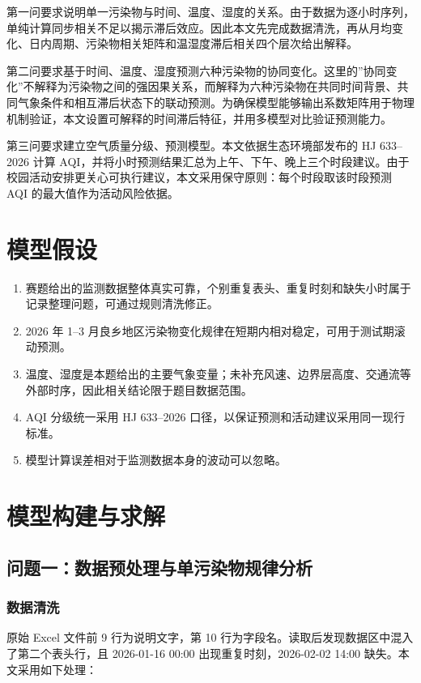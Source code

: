\documentclass[UTF8,a4paper,12pt]{ctexart}
\begin{document}
第一问要求说明单一污染物与时间、温度、湿度的关系。由于数据为逐小时序列，单纯计算同步相关不足以揭示滞后效应。因此本文先完成数据清洗，再从月均变化、日内周期、污染物相关矩阵和温湿度滞后相关四个层次给出解释。

第二问要求基于时间、温度、湿度预测六种污染物的协同变化。这里的”协同变化”不解释为污染物之间的强因果关系，而解释为六种污染物在共同时间背景、共同气象条件和相互滞后状态下的联动预测。为确保模型能够输出系数矩阵用于物理机制验证，本文设置可解释的时间滞后特征，并用多模型对比验证预测能力。

第三问要求建立空气质量分级、预测模型。本文依据生态环境部发布的 HJ 633--2026 计算 AQI，并将小时预测结果汇总为上午、下午、晚上三个时段建议。由于校园活动安排更关心可执行建议，本文采用保守原则：每个时段取该时段预测 AQI 的最大值作为活动风险依据。

\section{模型假设}

\begin{enumerate}
  \item 赛题给出的监测数据整体真实可靠，个别重复表头、重复时刻和缺失小时属于记录整理问题，可通过规则清洗修正。
  \item 2026 年 1--3 月良乡地区污染物变化规律在短期内相对稳定，可用于测试期滚动预测。
  \item 温度、湿度是本题给出的主要气象变量；未补充风速、边界层高度、交通流等外部时序，因此相关结论限于题目数据范围。
  \item AQI 分级统一采用 HJ 633--2026 口径，以保证预测和活动建议采用同一现行标准。
  \item 模型计算误差相对于监测数据本身的波动可以忽略。
\end{enumerate}

\section{模型构建与求解}

\subsection{问题一：数据预处理与单污染物规律分析}

\subsubsection{数据清洗}

原始 Excel 文件前 9 行为说明文字，第 10 行为字段名。读取后发现数据区中混入了第二个表头行，且 2026-01-16 00:00 出现重复时刻，2026-02-02 14:00 缺失。本文采用如下处理：
\end{document}
